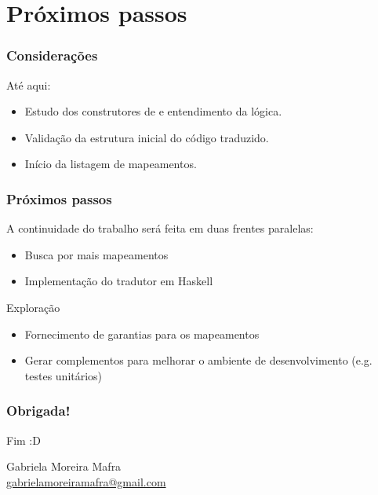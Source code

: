 \documentclass{beamer}
\begin{document}
\section{Próximos passos}

\begin{frame}
  \frametitle{Considerações}

  Até aqui:
  \begin{itemize}
    \item Estudo dos construtores de \TLA e entendimento da lógica.
    \item Validação da estrutura inicial do código traduzido.
    \item Início da listagem de mapeamentos.
  \end{itemize}

\end{frame}

\begin{frame}
  \frametitle{Próximos passos}

  A continuidade do trabalho será feita em duas frentes paralelas:
  \begin{itemize}
    \item Busca por mais mapeamentos
    \item Implementação do tradutor em Haskell
  \end{itemize}\medskip\pause

  \begin{block}{Exploração}
    \begin{itemize}
      \item Fornecimento de garantias para os mapeamentos
      \item Gerar complementos para melhorar o ambiente de desenvolvimento (e.g. testes unitários)
    \end{itemize}
  \end{block}

\end{frame}

\begin{frame}
  \frametitle{Obrigada!}

  {\Huge Fim :D}\bigskip

  Gabriela Moreira Mafra\\\smallskip
  {\url{gabrielamoreiramafra@gmail.com}}

\end{frame}
\end{document}
